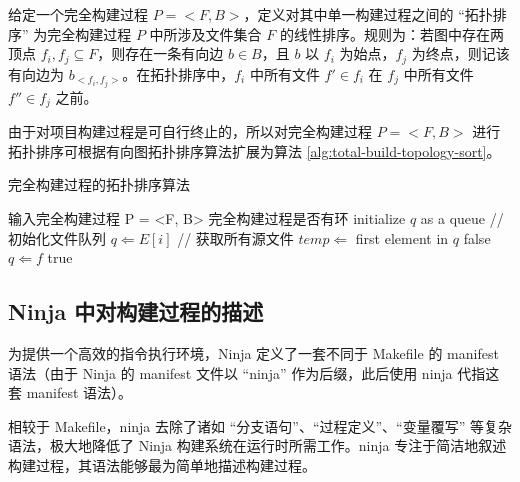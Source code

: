 \begin{lem}
    给定一个完全构建过程 $P = <F, B>$，定义对其中单一构建过程之间的 “拓扑排序” 为完全构建过程 $P$ 中所涉及文件集合 $F$ 的线性排序。规则为：若图中存在两顶点 $f_i, f_j \subseteq F$，则存在一条有向边 $b \in B$，且 $b$ 以 $f_i$ 为始点，$f_j$ 为终点，则记该有向边为 $b_{<f_i, f_j>}$。在拓扑排序中，$f_i$ 中所有文件 $f' \in f_i$ 在 $f_j$ 中所有文件 $f'' \in f_j$ 之前。
\end{lem}

由于对项目构建过程是可自行终止的，所以对完全构建过程 $P = <F, B>$ 进行拓扑排序可根据有向图拓扑排序算法扩展为算法 \ref{alg:total-build-topology-sort}。

\renewcommand{\thealgorithm}{3}
    \begin{algorithm}
        \caption{完全构建过程的拓扑排序算法}
        \begin{algorithmic}[1]
            \Require 输入完全构建过程 P = <F, B>
            \Ensure 完全构建过程是否有环
            \State initialize $q$ as a queue // 初始化文件队列
                    \State $q \Leftarrow E[i]$ // 获取所有源文件
                \EndIf
            \EndFor
                \State $temp \Leftarrow$ first element in $q$
                            \State \Return false
                        \EndIf
                        \State $q \Leftarrow f$                         
                    \EndFor
                \EndFor
            \EndWhile
            \State \Return true
        \end{algorithmic}
        \label{alg:total-build-topology-sort}
    \end{algorithm}

\subsection{Ninja 中对构建过程的描述}

为提供一个高效的指令执行环境，Ninja 定义了一套不同于 Makefile 的 manifest 语法（由于 Ninja 的 manifest 文件以 “ninja” 作为后缀，此后使用 ninja 代指这套 manifest 语法）。

相较于 Makefile，ninja 去除了诸如 “分支语句”、“过程定义”、“变量覆写” 等复杂语法，极大地降低了 Ninja 构建系统在运行时所需工作。ninja 专注于简洁地叙述构建过程，其语法能够最为简单地描述构建过程。

